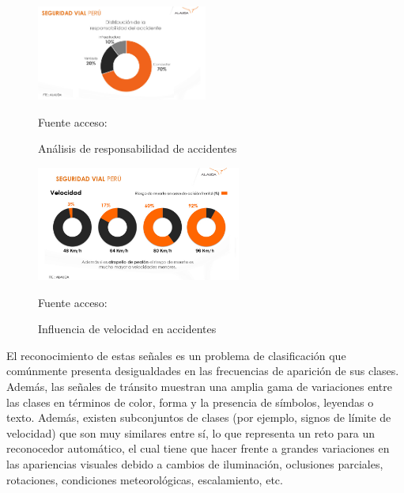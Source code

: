 	\begin{figure}[H]
	\begin{center}
	\includegraphics[width=0.5\textwidth]{images/intro/responsabilidad_cond}
	\end{center}
	\begin{center}
	\caption{\small{Análisis de responsabilidad de accidentes}}
	{\small{Fuente acceso: \cite{Gestion1}}}
	\end{center}
	\vspace{-1.5em}
	\end{figure}

	\begin{figure}[H]
	\begin{center}
	\includegraphics[width=0.6\textwidth]{images/intro/velocidad_ind}
	\end{center}
	\begin{center}
	\caption{\small{Influencia de velocidad en accidentes}}
	{\small{Fuente acceso: \cite{Gestion1}}}
	\end{center}
	\vspace{-1.5em}
	\end{figure}
	
	
	El reconocimiento de estas señales es un problema de clasificación que comúnmente presenta desigualdades en las frecuencias de aparición de sus clases. Además, las señales de tránsito muestran una amplia gama de variaciones entre las clases en términos de color, forma y la presencia de símbolos, leyendas o texto. Además, existen subconjuntos de clases (por ejemplo, signos de límite de velocidad) que son muy similares entre sí, lo que representa un reto para un reconocedor automático, el cual tiene que hacer frente a grandes variaciones en las apariencias visuales debido a cambios de iluminación, oclusiones parciales, rotaciones, condiciones meteorológicas, escalamiento, etc.
    

